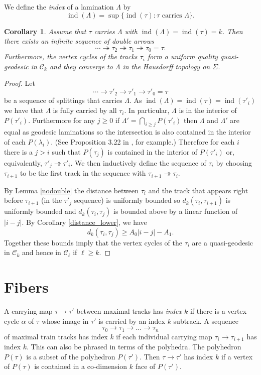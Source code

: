 \documentclass[11pt]{article}
\newtheorem{cor}[thm]{Corollary}
\theoremstyle{remark}
\def\C{{\mathcal C}}
\def\ind{\operatorname{ind}}
\begin{document}
We define the \emph{index} of a
lamination $\Lambda$ by
\[
  \ind(\Lambda) = \sup \{\ind(\tau) : \tau \mbox{ carries }\Lambda\}.
\]


\begin{cor}\label{converge to boundary}
Assume that $\tau$ carries $\Lambda$ with $\ind(\Lambda) = \ind(\tau) =k$.
Then there exists an infinite sequence of double arrows
$$\cdots \twoheadrightarrow \tau_2 \twoheadrightarrow \tau_1 \twoheadrightarrow \tau_0 = \tau.$$
Furthermore, the vertex cycles of the tracks $\tau_i$ form a uniform quality quasi-geodesic in $\C_k$  and they converge to $\Lambda$ in the Hausdorff topology on $\Sigma$.
\end{cor}

\begin{proof}
Let 
$$\cdots \to \tau'_2 \to \tau'_1 \to \tau'_0 = \tau$$
be a sequence of splittings that carries $\Lambda$. As $\ind(\Lambda) = \ind(\tau) = \ind(\tau'_i)$ we have that $\Lambda$ is fully carried by all $\tau_i$. In particular, $\Lambda$ is in the interior of $P(\tau'_i)$. Furthermore for any $j\ge 0$ if $\Lambda' = \displaystyle\bigcap_{i \ge j} P(\tau'_i)$ then $\Lambda$ and $\Lambda'$ are equal as geodesic laminations so the intersection is also contained in the interior of each $P(\lambda_i)$. (See Proposition 3.22 in \cite{BB}, for example.) Therefore for each $i$ there is a $j> i$ such that $P(\tau_j)$ is contained in the interior of $P(\tau'_i)$ or, equivalently, $\tau'_j \twoheadrightarrow \tau'_i$. We then inductively define the sequence of $\tau_i$ by choosing $\tau_{i+1}$ to be the first track in the sequence with $\tau_{i+1}\twoheadrightarrow \tau_i$.

By Lemma \ref{nodouble} the distance between $\tau_i$ and the track that appears right before $\tau_{i+1}$ (in the $\tau'_j$ sequence) is uniformly bounded so $d_k(\tau_i, \tau_{i+1})$ is uniformly bounded and $d_k(\tau_i, \tau_j)$ is bounded above by a linear function of $|i-j|$.
By Corollary \ref{distance_lower}, we have
$$d_k(\tau_i, \tau_j) \ge A_0 |i-j| - A_1.$$
Together these bounds imply that the vertex cycles of the $\tau_i$ are a quasi-geodesic in $\C_k$ and hence in $\C_\ell$ if $\ell \ge k$. 
\end{proof}



\section{Fibers}\label{sec:7}
A carrying map  $\tau\to \tau'$ between maximal tracks has {\em index $k$} if there is a vertex cycle $\alpha$ of $\tau$ whose image in $\tau'$ is carried by an index $k$ subtrack.
A sequence
$$\tau_0 \to \tau_1 \to \ldots \to \tau_n$$
of maximal train tracks has index $k$ if each individual carrying map $\tau_i\to \tau_{i+1}$ has index $k$. This can also be phrased in terms of the polyhedra. The polyhedron $P(\tau)$ is a subset of the polyhedron $P(\tau')$. Then $\tau\to \tau'$ has index $k$ if a vertex of $P(\tau)$ is contained in a co-dimension $k$ face of $P(\tau')$.
\end{document}
